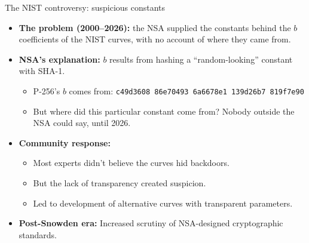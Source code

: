 \ifdefined\PRESENTATION\else\PassOptionsToClass{handout}{beamer}\fi\documentclass[aspectratio=169, lualatex]{beamer}
\begin{document}
\begin{frame}{The NIST controversy: suspicious constants}
	\begin{itemize}[<+->]
		\item \textbf{The problem (2000--2026):} the NSA supplied the constants behind the $b$ coefficients of the NIST curves, with no account of where they came from.
		\item \textbf{NSA's explanation:} $b$ results from hashing a ``random-looking'' constant with SHA-1.
		      \begin{itemize}
			      \item P-256's $b$ comes from: \texttt{c49d3608 86e70493 6a6678e1 139d26b7 819f7e90}
			      \item But where did this particular constant come from? Nobody outside the NSA could say, until 2026.
		      \end{itemize}
		\item \textbf{Community response:}
		      \begin{itemize}
			      \item Most experts didn't believe the curves hid backdoors.
			      \item But the lack of transparency created suspicion.
			      \item Led to development of alternative curves with transparent parameters.
		      \end{itemize}
		\item \textbf{Post-Snowden era:} Increased scrutiny of NSA-designed cryptographic standards.
	\end{itemize}
\end{frame}
\end{document}
